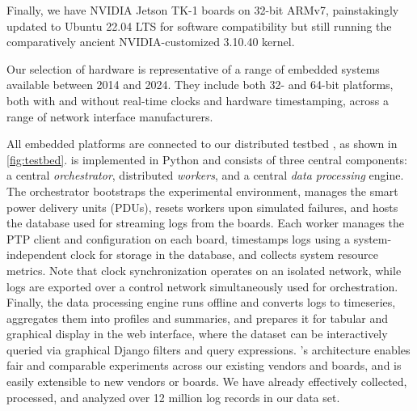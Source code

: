 Finally, we have NVIDIA Jetson TK-1 boards on 32-bit ARMv7,
painstakingly updated to Ubuntu 22.04 LTS for software compatibility but still
running the comparatively ancient NVIDIA-customized 3.10.40 kernel.

Our selection of hardware is representative
of a range of embedded systems available between 2014 and 2024.
They include both 32- and 64-bit platforms,
both with and without real-time clocks and hardware timestamping,
across a range of network interface manufacturers.

All embedded platforms are connected to our distributed testbed \toolName{},
as shown in \cref{fig:testbed}.
\toolName{} is implemented in Python and consists of three central components:
a central \textit{orchestrator}, distributed \textit{workers}, and a
central \textit{data processing} engine.
The orchestrator bootstraps the
experimental environment, manages the smart power delivery units (PDUs),
resets workers upon simulated failures,
and hosts the database used for streaming logs from the boards.
Each worker manages the PTP client and configuration on each board,
timestamps logs using a system-independent clock for storage in the database,
and collects system resource metrics.
Note that clock synchronization operates on an isolated network, while logs are
exported over a control network simultaneously used for orchestration.
Finally, the data processing engine runs offline and converts logs to timeseries,
aggregates them into profiles and summaries, and prepares it for tabular and
graphical display in the \toolName{} web interface, where the dataset can be
interactively queried via graphical Django filters and query expressions.
\toolName{}'s architecture enables fair and comparable experiments across our
existing vendors and boards, and is easily extensible to new vendors or boards.
We have already effectively collected, processed, and analyzed over 12 million
log records in our data set.


